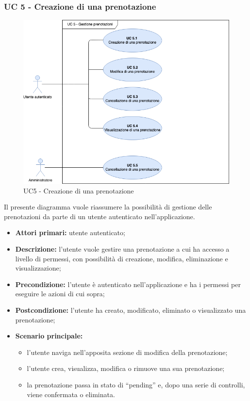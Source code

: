 \subsubsection{UC 5 - Creazione di una prenotazione}

\begin{figure}[h]
  \centering
    \includegraphics[scale=0.5]{CasiDUso/Immagini/UC5.png}
  \caption{UC5  - Creazione di una prenotazione}
\end{figure}

Il presente diagramma vuole riassumere la possibilità di gestione delle prenotazioni da parte di un utente autenticato nell’applicazione.

\begin{itemize}
\item \textbf{Attori primari:} utente autenticato;
\item \textbf{Descrizione:} l’utente vuole gestire una prenotazione a cui ha accesso a livello di permessi, con possibilità di creazione, modifica, eliminazione e visualizzazione;
\item \textbf{Precondizione:} l’utente è autenticato nell’applicazione e ha i permessi per eseguire le azioni di cui sopra;
\item \textbf{Postcondizione:} l’utente ha creato, modificato, eliminato o visualizzato una prenotazione;
\item \textbf{Scenario principale:} 
	\begin{itemize}
		\item l’utente naviga nell’apposita sezione di modifica della prenotazione;
		\item l’utente crea, visualizza, modifica o rimuove una sua prenotazione;
		\item la prenotazione passa in stato di “pending” e, dopo una serie di controlli, viene confermata o eliminata.
	\end{itemize}
\end{itemize}


